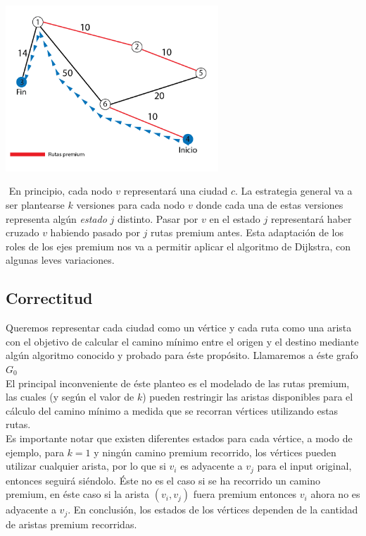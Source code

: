 {\centering
	\includegraphics[width=0.6\textwidth]{imagenes/problema1/problema1-c2-solved.png} \\
}

$ $ \newline
En principio, cada nodo $v$ representará una ciudad $c$. La estrategia general va a ser plantearse $k$ versiones para cada nodo $v$ donde cada una de estas versiones representa algún \textit{estado} $j$ distinto. Pasar por $v$ en el estado $j$ representará haber cruzado $v$ habiendo pasado por $j$ rutas premium antes. Esta adaptación de los roles de los ejes premium nos va a permitir aplicar el algoritmo de Dijkstra, con algunas leves variaciones.

\subsection{Correctitud}
Queremos representar cada ciudad como un vértice y cada ruta como una arista con el objetivo de calcular el camino mínimo entre el origen y el destino mediante algún algoritmo conocido y probado para éste propósito. Llamaremos a éste grafo $G_0$\\

El principal inconveniente de éste planteo es el modelado de las rutas premium, las cuales (y según el valor de $k$) pueden restringir las aristas disponibles para el cálculo del camino mínimo a medida que se recorran vértices utilizando estas rutas.\\

Es importante notar que existen diferentes estados para cada vértice, a modo de ejemplo, para $k=1$ y ningún camino premium recorrido, los vértices pueden utilizar cualquier arista, por lo que si $v_i$ es adyacente a $v_j$ para el input original, entonces seguirá siéndolo. Éste no es el caso si se ha recorrido un camino premium, en éste caso si la arista $(v_i, v_j)$ fuera premium entonces $v_i$ ahora no es adyacente a $v_j$. En conclusión, los estados de los vértices dependen de la cantidad de aristas premium recorridas.\\

